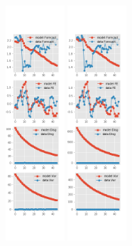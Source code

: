 \documentclass[]{article}
\begin{document}
\begin{figure}[ht]
\begin{subfigure}[b]{\textwidth}
		\includegraphics[width=0.24\textwidth]{figures/spf_ni_est_diag1.png}
		\includegraphics[width=0.24\textwidth]{figures/spf_ni_est_diag2.png}

\end{subfigure}
\end{figure}
\end{document}
